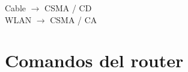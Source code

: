 \documentclass[letterpaper,12pt]{article}
\begin{document}
\begin{sloppypar}
Cable $\rightarrow$ CSMA / CD
\vspace{0.3cm}\\  
WLAN $\rightarrow$ CSMA / CA 

\section{Comandos del router}



\end{sloppypar}
\end{document}
